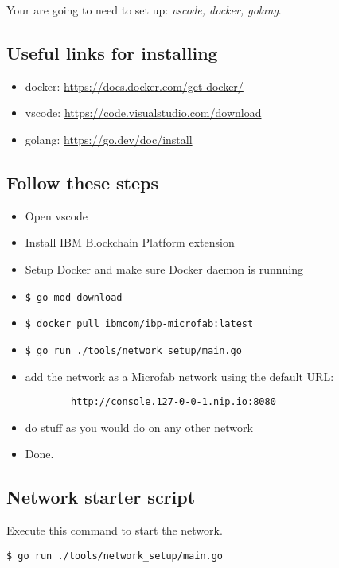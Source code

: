 Your are going to need to set up: \emph{vscode, docker, golang}.
\subsection{Useful links for installing}
\begin{itemize}
    \item docker: \href{https://docs.docker.com/get-docker/}{https://docs.docker.com/get-docker/}
    \item vscode: \href{https://code.visualstudio.com/download}{https://code.visualstudio.com/download}
    \item golang: \href{https://go.dev/doc/install}{https://go.dev/doc/install}
\end{itemize}
\subsection{Follow these steps}
\begin{itemize}
    \item Open vscode
    \item Install IBM Blockchain Platform extension
    \item Setup Docker and make sure Docker daemon is runnning
    \item \begin{verbatim}$ go mod download\end{verbatim}
    \item \begin{verbatim}$ docker pull ibmcom/ibp-microfab:latest\end{verbatim}
    \item \begin{verbatim}$ go run ./tools/network_setup/main.go\end{verbatim}
    \item add the network as a Microfab network using the default URL: \begin{verbatim}
        http://console.127-0-0-1.nip.io:8080
    \end{verbatim}
    \item do stuff as you would do on any other network
    \item Done.
\end{itemize}

\subsection{Network starter script}
Execute this command to start the network.
\begin{verbatim}$ go run ./tools/network_setup/main.go\end{verbatim}
